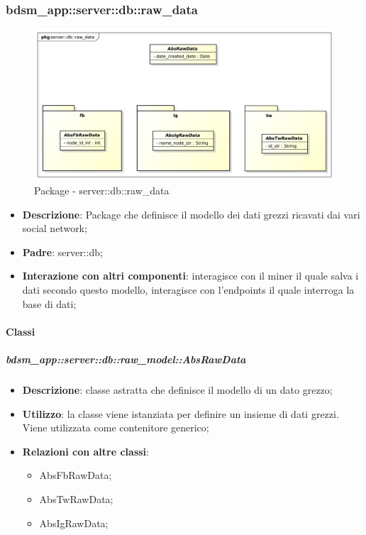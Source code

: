 \subsubsection{bdsm\_app::server::db::raw\_data} %
\label{ssub:bdsm_app_server_raw_model}

	\begin{figure}[htbp]
		\centering
		\centerline{\includegraphics[scale=0.35]{./images/server/raw_data.pdf}}
		\caption{Package - server::db::raw\_data}
	\end{figure}
	\begin{itemize}
	\item \textbf{Descrizione}: Package che definisce il modello dei dati grezzi ricavati dai vari social network;
		\item \textbf{Padre}: server::db;
		\item \textbf{Interazione con altri componenti}: interagisce con il miner il quale salva i dati secondo questo modello, interagisce con l'endpoints il quale interroga la base di dati;
	\end{itemize}


	\paragraph{Classi} %
		

		\subparagraph{bdsm\_app::server::db::raw\_model::AbsRawData} %
		\label{subp:bdsm_app_server_raw_model_AbsRawData}
			\begin{itemize}
				\item \textbf{Descrizione}: classe astratta che definisce il modello di un dato grezzo;
				\item \textbf{Utilizzo}: la classe viene istanziata per definire un insieme di dati grezzi. Viene utilizzata come contenitore generico;
				\item \textbf{Relazioni con altre classi}:
					\begin{itemize}
						\item AbsFbRawData;
						\item AbsTwRawData;
						\item AbsIgRawData;
					\end{itemize}
			\end{itemize}


